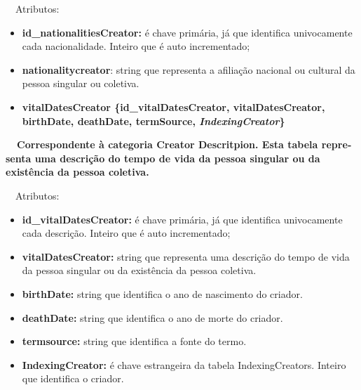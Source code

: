 \documentclass[letterpaper]{article}
\newcommand\textstyleStrongEmphasis[1]{\textbf{#1}}
\newcommand\liststyleLi{%
\renewcommand\labelitemi{{\textbullet}}
\renewcommand\labelitemii{[27A2?]}
\renewcommand\labelitemiii{{\textbullet}}
\renewcommand\labelitemiv{{\textbullet}}
}
\newcommand\liststyleLxiii{%
\renewcommand\labelitemi{[27A2?]}
\renewcommand\labelitemii{[27A2?]}
\renewcommand\labelitemiii{[27A2?]}
\renewcommand\labelitemiv{[27A2?]}
}
\newcommand\liststyleLxiv{%
\renewcommand\labelitemi{[27A2?]}
\renewcommand\labelitemii{[27A2?]}
\renewcommand\labelitemiii{[27A2?]}
\renewcommand\labelitemiv{[27A2?]}
}
\begin{document}
\bigskip

{
\ \ Atributos:}

\liststyleLxiii
\begin{itemize}
\item {
\textbf{id\_nationalitiesCreator:} \'e chave prim\'aria, j\'a que
identifica univocamente cada nacionalidade. Inteiro que \'e auto
incrementado;}
\item {
\textbf{nationalitycreator}: string que representa a afilia\c{c}\~ao
nacional ou cultural da pessoa singular ou coletiva.}


\bigskip
\end{itemize}
\liststyleLi
\begin{itemize}
\item {\bfseries
vitalDatesCreator\textmd{ \{}\textmd{id\_vitalDatesCreator}\textmd{,
vitalDatesCreator, birthDate, deathDate, termSource,
}\textmd{\textit{IndexingCreator}}\textmd{\}}}
\end{itemize}
{\bfseries
\foreignlanguage{english}{\ \ }\foreignlanguage{english}{\textmd{Correspondente
\`a categoria
}}\textstyleStrongEmphasis{\foreignlanguage{english}{Creator
Descritpion}}\foreignlanguage{english}{\textmd{. Esta
}}\textstyleStrongEmphasis{\foreignlanguage{english}{\textmd{tabela}}}\foreignlanguage{english}{\textmd{
representa uma descri\c{c}\~ao do tempo de vida da pessoa singular ou
da exist\^encia da pessoa coletiva.}}}


\bigskip

{
\ \ Atributos:}

\liststyleLxiv
\begin{itemize}
\item {
\textbf{id\_vitalDatesCreator: }\'e chave prim\'aria, j\'a que
identifica univocamente cada descri\c{c}\~ao. Inteiro que \'e auto
incrementado;}
\item {
\textbf{vitalDatesCreator: }string que representa uma descri\c{c}\~ao do
tempo de vida da pessoa singular ou da exist\^encia da pessoa
coletiva.}
\item {
\textbf{birthDate:} string que identifica o ano de nascimento do
criador.}
\item {
\textbf{deathDate:} string que identifica o ano de morte do criador.}
\item {
\textbf{termsource: }string que identifica a fonte do termo.}
\item {
\textbf{IndexingCreator}\textbf{:} \'e chave estrangeira da tabela
IndexingCreators. Inteiro que identifica o criador.}
\end{itemize}
\end{document}
